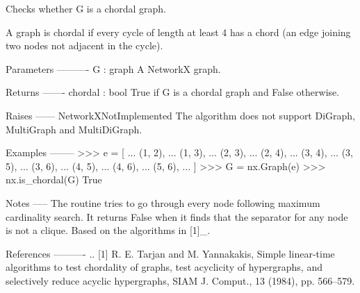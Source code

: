 \begin{DoxyVerb}Checks whether G is a chordal graph.

A graph is chordal if every cycle of length at least 4 has a chord
(an edge joining two nodes not adjacent in the cycle).

Parameters
----------
G : graph
  A NetworkX graph.

Returns
-------
chordal : bool
  True if G is a chordal graph and False otherwise.

Raises
------
NetworkXNotImplemented
    The algorithm does not support DiGraph, MultiGraph and MultiDiGraph.

Examples
--------
>>> e = [
...     (1, 2),
...     (1, 3),
...     (2, 3),
...     (2, 4),
...     (3, 4),
...     (3, 5),
...     (3, 6),
...     (4, 5),
...     (4, 6),
...     (5, 6),
... ]
>>> G = nx.Graph(e)
>>> nx.is_chordal(G)
True

Notes
-----
The routine tries to go through every node following maximum cardinality
search. It returns False when it finds that the separator for any node
is not a clique.  Based on the algorithms in [1]_.

References
----------
.. [1] R. E. Tarjan and M. Yannakakis, Simple linear-time algorithms
   to test chordality of graphs, test acyclicity of hypergraphs, and
   selectively reduce acyclic hypergraphs, SIAM J. Comput., 13 (1984),
   pp. 566–579.
\end{DoxyVerb}
 